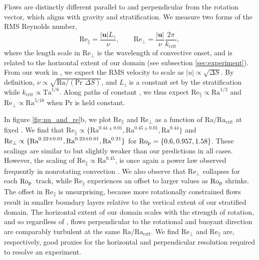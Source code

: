 Flows are distinctly different parallel to and perpendicular
from the rotation vector, which aligns with gravity and stratification.
We measure two forms of the RMS Reynolds number,
\begin{equation}
\text{Re}_{\parallel} = \frac{|\bm{u}| L_z}{\nu}, \qquad
\text{Re}_{\perp}     = \frac{|\bm{u}|}{\nu}\frac{2\pi}{k_{\text{crit}}},
\label{eqn:re_defn}
\end{equation}
where the length scale in $\text{Re}_{\perp}$ is the wavelength of convective onset, and is
related to the horizontal extent of our domain (see subsection \ref{sec:experiment}).
From our work in \AB, we expect the RMS velocity to scale as $|u| \propto \sqrt{\Delta S}$.
By definition, $\nu \propto \sqrt{\text{Ra}/(\text{Pr }\Delta S)}$, and $L_z$ is a constant
set by the stratification while $k_{\text{crit}} \propto \text{Ta}^{1/6}$. Along paths of
constant \pro, we thus expect $\text{Re}_{\parallel} \propto \text{Ra}^{1/2}$ and
$\text{Re}_{\perp} \propto \text{Ra}^{5/18}$ when $\text{Pr}$ is held constant.

In figure \ref{fig:nu_and_re}b, we plot $\text{Re}_{\parallel}$ and $\text{Re}_{\perp}$
as a function of Ra$/\text{Ra}_{\text{crit}}$ at fixed \pro. We find that $\text{Re}_\parallel \propto \{\text{Ra}^{0.44 \pm 0.01}, \text{Ra}^{0.45 \pm 0.01}, \text{Ra}^{0.44}\}$
and $\text{Re}_\perp \propto \{\text{Ra}^{0.22 \pm 0.01}, \\ \text{Ra}^{0.23 \pm 0.01}, \text{Ra}^{0.21}\}$ for
$\text{Ro}_{\text{p}} = \{0.6, 0.957, 1.58\}$. These scalings are similar to but slightly weaker than our
predictions in all cases. However, the scaling of $\text{Re}_{\parallel} \propto \text{Ra}^{0.45}$, 
is once again a power law observed frequently in nonrotating convection \cite[][\AB]{ahlers&all2009}.
We also observe that $\text{Re}_{\perp}$ collapses for each $\text{Ro}_{\text{p}}\,$ track,
while $\text{Re}_{\parallel}$ experiences an offset
to larger values as $\text{Ro}_{\text{p}}$ shrinks. The offset in $\text{Re}_{\parallel}$ is unsurprising, 
because more rotationally constrained flows result in smaller boundary layers relative to the 
vertical extent of our stratified domain. The horizontal extent of our domain scales with the
strength of rotation, and so regardless of \pro, flows perpendicular
to the rotational and buoyant direction are comparably turbulent at the same 
$\text{Ra}/\text{Ra}_\text{crit}$.
We find $\text{Re}_{\perp}$ and $\text{Re}_{\parallel}$ are, respectively, good proxies for
the horizontal and perpendicular resolution required to resolve an experiment.

